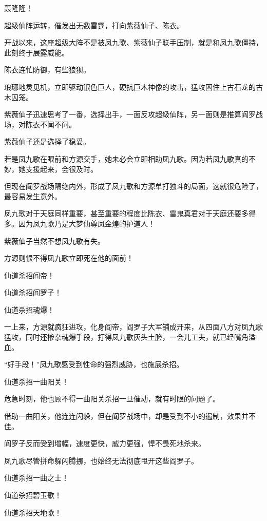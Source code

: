 
\begin{this_body}



轰隆隆！

超级仙阵运转，催发出无数雷霆，打向紫薇仙子、陈衣。

开战以来，这座超级大阵不是被凤九歌、紫薇仙子联手压制，就是和凤九歌僵持，此刻终于展露威能。

陈衣连忙防御，有些狼狈。

琅琊地灵见机，立即驱动银色巨人，硬抗巨木神像的攻击，猛攻困住上古石龙的古木囚笼。

紫薇仙子迅速思考了一番，选择出手，一面反攻超级仙阵，另一面则是推算阎罗战场，对陈衣不闻不问。

紫薇仙子还是选择了稳妥。

若是凤九歌在眼前和方源交手，她未必会立即相助凤九歌。因为若凤九歌真的不妙，她支援起来，会很及时。

但现在阎罗战场隔绝内外，形成了凤九歌和方源单打独斗的局面，这就很危险了，最容易发生意外。

凤九歌对于天庭同样重要，甚至重要的程度比陈衣、雷鬼真君对于天庭还要多得多。因为凤九歌乃是大梦仙尊凤金煌的护道人！

紫薇仙子当然不想凤九歌有失。

方源则恨不得凤九歌立即死在他的面前！

仙道杀招阎帝！

仙道杀招阎罗子！

仙道杀招魂爆！

一上来，方源就疯狂进攻，化身阎帝，阎罗子大军铺成开来，从四面八方对凤九歌猛攻，同时还掺杂魂爆手段，打得凤九歌灰头土脸，一会儿工夫，就已经嘴角溢血。

“好手段！”凤九歌感受到性命的强烈威胁，也施展杀招。

仙道杀招一曲阳关！

危急时刻，他也顾不得一曲阳关杀招一旦催动，就有时限的问题了。

借助一曲阳关，他连连闪躲，但在阎罗战场中，却是受到不小的遏制，效果并不佳。

阎罗子反而受到增幅，速度更快，威力更强，悍不畏死地杀来。

凤九歌尽管拼命躲闪腾挪，也始终无法彻底甩开这些阎罗子。

仙道杀招一曲之士！

仙道杀招碧玉歌！

仙道杀招天地歌！


\end{this_body}
